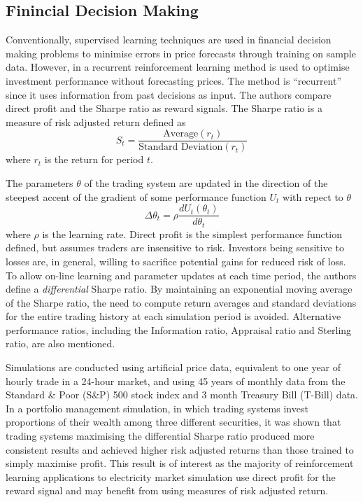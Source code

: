 \subsection{Finincial Decision Making}
Conventionally, supervised learning techniques are used in financial decision
making problems to minimise errors in price forecasts through training on
sample data.  However, in \cite{moody:98} a recurrent reinforcement learning
method is used to optimise investment performance without forecasting prices.
The method is ``recurrent'' since it uses information from past decisions as
input.  The authors compare direct profit and the Sharpe ratio
\cite{sharpe:ratio66,sharpe:ratio94} as reward signals. The Sharpe ratio is a
measure of risk adjusted return defined as
\begin{equation}
S_t = \frac{\mbox{Average}(r_t)}{\mbox{Standard Deviation}(r_t)}
\end{equation}
where $r_t$ is the return for period $t$.

The parameters $\theta$ of the trading system are updated in the direction of
the steepest accent of the gradient of some performance function $U_t$ with
repect to $\theta$
\begin{equation}
\Delta\theta_t = \rho \frac{dU_t(\theta_t)}{d\theta_t}
\end{equation}
where $\rho$ is the learning rate.  Direct profit is the simplest performance
function defined, but assumes traders are insensitive to risk.  Investors
being sensitive to losses are, in general, willing to sacrifice potential gains
for reduced risk of loss. To allow on-line learning and parameter updates at
each time period, the authors define a \textit{differential} Sharpe ratio.  By maintaining an
exponential moving average of the Sharpe ratio, the need to compute return
averages and standard deviations for the entire trading history at each
simulation period is avoided.  Alternative performance ratios, including the
Information ratio, Appraisal ratio and Sterling ratio, are also mentioned.

Simulations are conducted using artificial price data, equivalent to one year
of hourly trade in a 24-hour market, and using 45 years of monthly data from
the Standard \& Poor (S\&P) 500 stock index and 3 month Treasury Bill (T-Bill)
data. In a portfolio management simulation, in which trading systems invest
proportions of their wealth among three different securities, it was shown
that trading systems maximising the differential Sharpe ratio produced more
consistent results and achieved higher risk adjusted returns than those
trained to simply maximise profit.  This result is of interest as the majority
of reinforcement learning applications to electricity market simulation use
direct profit for the reward signal and may benefit from using measures of risk
adjusted return.

